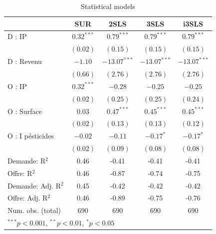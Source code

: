 \documentclass[11pt,]{article}
\begin{document}
\FloatBarrier

\begin{table}[!htbp]
\begin{center}
\begin{tabular}{l c c c c }
\hline
 & SUR & 2SLS & 3SLS & i3SLS \\
\hline
D : IP              & $0.32^{***}$ & $0.79^{***}$   & $0.79^{***}$   & $0.79^{***}$   \\
                    & $(0.02)$     & $(0.15)$       & $(0.15)$       & $(0.15)$       \\
D : Revenu          & $-1.10$      & $-13.07^{***}$ & $-13.07^{***}$ & $-13.07^{***}$ \\
                    & $(0.66)$     & $(2.76)$       & $(2.76)$       & $(2.76)$       \\
O : IP              & $0.32^{***}$ & $-0.28$        & $-0.25$        & $-0.25$        \\
                    & $(0.02)$     & $(0.25)$       & $(0.25)$       & $(0.24)$       \\
O : Surface         & $0.03$       & $0.47^{***}$   & $0.45^{***}$   & $0.45^{***}$   \\
                    & $(0.02)$     & $(0.13)$       & $(0.13)$       & $(0.12)$       \\
O : I pésticides    & $-0.02$      & $-0.11$        & $-0.17^{*}$    & $-0.17^{*}$    \\
                    & $(0.02)$     & $(0.09)$       & $(0.08)$       & $(0.08)$       \\
\hline
Demande: R$^2$      & 0.46         & -0.41          & -0.41          & -0.41          \\
Offre: R$^2$        & 0.46         & -0.87          & -0.74          & -0.75          \\
Demande: Adj. R$^2$ & 0.45         & -0.42          & -0.42          & -0.42          \\
Offre: Adj. R$^2$   & 0.46         & -0.89          & -0.75          & -0.76          \\
Num. obs. (total)   & 690          & 690            & 690            & 690            \\
\hline
\multicolumn{5}{l}{\scriptsize{$^{***}p<0.001$, $^{**}p<0.01$, $^*p<0.05$}}
\end{tabular}
\caption{Statistical models}
\label{table : sur, 2sls, 3sls and fiml}
\end{center}
\end{table}
\end{document}
